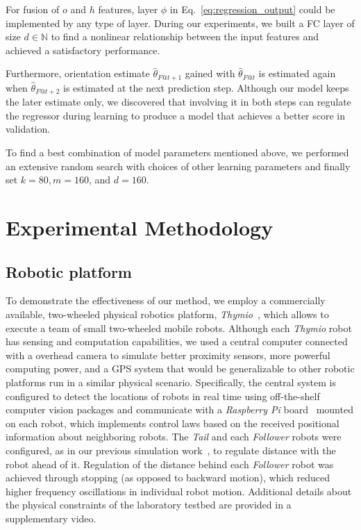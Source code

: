 \documentclass[letterpaper, 10 pt, conference]{ieeeconf}  %
\begin{document}
\begin{itemize}
            For fusion of $o$ and $h$ features, layer $\phi$ in
            Eq.~\eqref{eq:regression_output} could be implemented by any
            type of layer. During our experiments, we built a FC layer
            of size $d \in \mathbb{N}$ to find a nonlinear relationship
            between the input features and achieved a satisfactory
            performance.

            Furthermore, orientation estimate $\hat{\theta}_{F@t+1}$
            gained with $\hat{\theta}_{F@t}$ is estimated again when
            $\hat{\theta}_{F@t+2}$ is estimated at the next prediction
            step. Although our model keeps the later estimate only, we
            discovered that involving it in both steps can regulate the
            regressor during learning to produce a model that achieves a
            better score in validation.

    \end{itemize}
    To find a best combination of model parameters mentioned above, we
    performed an extensive random search with choices of other learning
    parameters and finally set $k=80, m=160$, and $d=160$.

	\section{Experimental Methodology}
	\label{sec:experiments}

    \subsection{Robotic platform}

    To demonstrate the effectiveness of our method, we employ a
    commercially available, two-wheeled physical robotics platform,
    \emph{Thymio}~\cite{Shin14}, which allows to execute a team of small
    two-wheeled mobile robots. Although each \emph{Thymio} robot has
    sensing and computation capabilities, we used a central computer
    connected with a overhead camera to simulate better proximity
    sensors, more powerful computing power, and a GPS system that would
    be generalizable to other robotic platforms run in a similar
    physical scenario. Specifically, the central system is configured to
    detect the locations of robots in real time using off-the-shelf
    computer vision packages and communicate with a \emph{Raspberry Pi}
    board~\cite{Upton14} mounted on each robot, which implements control
    laws based on the received positional information about neighboring
    robots. The \emph{Tail} and each \emph{Follower} robots were
    configured, as in our previous simulation work~\cite{CPR17}, to
    regulate distance with the robot ahead of it. Regulation of the
    distance behind each \emph{Follower} robot was achieved through
    stopping (as opposed to backward motion), which reduced higher
    frequency oscillations in individual robot motion. Additional
    details about the physical constraints of the laboratory testbed are
    provided in a supplementary video.
\end{document}
